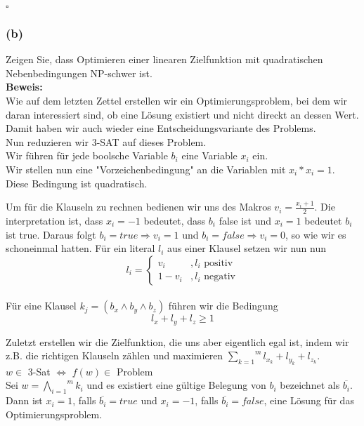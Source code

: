 \documentclass[11pt,a4paper,ngerman]{article}
\begin{document}
\mbox{}\hfill$\square$

\subsubsection*{(b)}
Zeigen Sie, dass Optimieren einer linearen Zielfunktion mit quadratischen Nebenbedingungen NP-schwer ist.\\

\textbf{Beweis:}\\

Wie auf dem letzten Zettel erstellen wir ein Optimierungsproblem, bei dem wir daran interessiert sind,
ob eine Lösung existiert und nicht direckt an dessen Wert. Damit haben wir auch wieder eine Entscheidungsvariante des Problems.\\

Nun reduzieren wir 3-SAT auf dieses Problem.\\

Wir führen für jede boolsche Variable $b_i$ eine Variable $x_i$ ein.\\
Wir stellen nun eine "Vorzeichenbedingung" an die Variablen mit
$x_i * x_i = 1$. Diese Bedingung ist quadratisch.

Um für die Klauseln zu rechnen bedienen wir uns des Makros $v_i = \frac{x_i + 1}{2}$.
Die interpretation ist, dass $x_i = -1$ bedeutet, dass $b_i$ false ist und $x_i = 1$ bedeutet $b_i$ ist true.
Daraus folgt $b_i = true \Rightarrow v_i = 1$ und $b_i = false \Rightarrow v_i = 0$, so wie wir es schoneinmal hatten.
Für ein literal $l_i$ aus einer Klausel setzen wir nun nun 
$$l_i = \left\{ \begin{array}{lr} v_i \quad &, l_i \text{ positiv} \\ 1-v_i &, l_i \text{ negativ} \end{array}\right.$$ \\

Für eine Klausel $k_j = (b_x \land b_y \land b_z)$ führen wir die Bedingung\\
$$
    l_x + l_y + l_z \geq 1
$$

Zuletzt erstellen wir die Zielfunktion, die uns aber eigentlich egal ist, indem wir
z.B. die richtigen Klauseln zählen und maximieren $\overset{m}{\underset{k=1}{\sum}} l_{x_k} + l_{y_k} + l_{z_k}$.\\

$w \in $ 3-Sat $\Leftrightarrow$ $f(w) \in$ Problem\\
Sei $w = \overset{m}{\underset{i=1}{\bigwedge}} k_i$ und es existiert eine gültige Belegung von $b_i$ bezeichnet als $\overline{b_i}$.\\
Dann ist $x_i = 1$, falls $\overline{b_i} = true$ und $x_i = -1$, falls $\overline{b_i} = false$, eine Lösung für das Optimierungsproblem.\\
\end{document}
